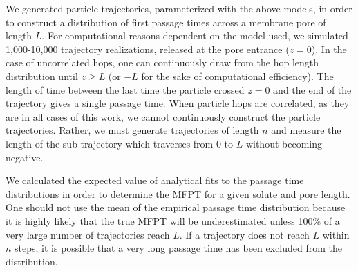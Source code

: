 \documentclass[12pt]{article}
\begin{document}
  We generated particle trajectories, parameterized with the above models, in order
  to construct a distribution of first passage times across a membrane pore of length $L$.
  For computational reasons dependent on the model used, we simulated 1,000-10,000 trajectory
  realizations, released at the pore entrance ($z=0$). In the case of 
  uncorrelated hops, one can continuously draw from the hop length distribution until 
  $z \geq L$ (or $-L$ for the sake of computational efficiency). The length of time 
  between the last time the particle crossed $z=0$ and the end of the trajectory gives a 
  single passage time. When particle hops are correlated, as they are in all cases of
  this work, we cannot continuously construct the particle trajectories. Rather, we must
  generate trajectories of length $n$ and measure the length of the sub-trajectory 
  which traverses from $0$ to $L$ without becoming negative.
  
  We calculated the expected value of analytical fits to the passage time distributions
  in order to determine the MFPT for a given solute and pore length. One should not 
  use the mean of the empirical passage time distribution because it is highly likely
  that the true MFPT will be underestimated unless 100\% of a very large number of 
  trajectories reach $L$. If a trajectory does not reach $L$ within $n$ steps, it is
  possible that a very long passage time has been excluded from the distribution.
  
  
\end{document}
